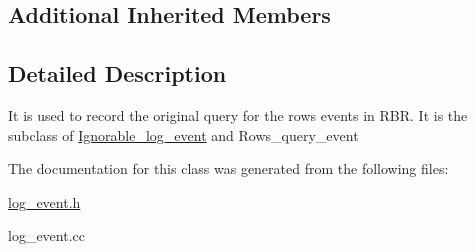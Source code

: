 \subsection*{Additional Inherited Members}


\subsection{Detailed Description}
It is used to record the original query for the rows events in R\+BR. It is the subclass of \mbox{\hyperlink{classIgnorable__log__event}{Ignorable\+\_\+log\+\_\+event}} and Rows\+\_\+query\+\_\+event 

The documentation for this class was generated from the following files\+:\begin{DoxyCompactItemize}
\item 
\mbox{\hyperlink{log__event_8h}{log\+\_\+event.\+h}}\item 
log\+\_\+event.\+cc\end{DoxyCompactItemize}
